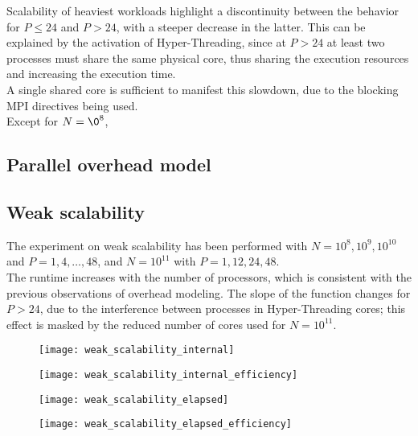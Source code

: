 \documentclass[a4paper, 11pt]{article}
\begin{document}
Scalability of heaviest workloads highlight a discontinuity between the behavior for $P \leq 24$ and $P > 24$, with a steeper decrease in the latter. This can be explained by the activation of Hyper-Threading, since at $P > 24$ at least two processes must share the same physical core, thus sharing the execution resources and increasing the execution time.\\
A single shared core is sufficient to manifest this slowdown, due to the blocking MPI directives being used.\\
Except for $N=\0^{8}$, 
\subsection{Parallel overhead model}

\subsection{Weak scalability}
The experiment on weak scalability has been performed with $N=10^{8}, 10^{9}, 10^{10}$ and $P=1, 4, \ldots , 48$, and $N=10^{11}$ with $P=1, 12, 24, 48$.\\
The runtime increases with the number of processors, which is consistent with the previous observations of overhead modeling. The slope of the function changes for $P > 24$, due to the interference between processes in Hyper-Threading cores; this effect is masked by the reduced number of cores used for $N=10^{11}$.
\begin{figure}[h]
\centering
\begin{minipage}{.5\textwidth}
  \centering
  \texttt{[image: weak\_scalability\_internal]}
  \label{fig:weak_scalability_internal}
\end{minipage}%
\begin{minipage}{.5\textwidth}
  \centering
  \texttt{[image: weak\_scalability\_internal\_efficiency]}
  \label{fig:weak_scalability_internal_efficiency}
\end{minipage}
\end{figure}
\begin{figure}[h]
\centering
\begin{minipage}{.5\textwidth}
  \centering
  \texttt{[image: weak\_scalability\_elapsed]}
  \label{fig:weak_scalability_elapsed}
\end{minipage}%
\begin{minipage}{.5\textwidth}
  \centering
  \texttt{[image: weak\_scalability\_elapsed\_efficiency]}
  \label{fig:weak_scalability_elapsed_efficiency}
\end{minipage}
\end{figure}
\end{document}
